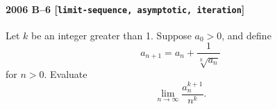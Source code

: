 \paragraph{2006 B--6 \textnormal{[\texttt{limit-sequence, asymptotic, iteration}]}}
Let $k$ be an integer greater than 1. Suppose $a_0 > 0$, and define
\[
a_{n+1} = a_n + \frac{1}{\sqrt[k]{a_n}}
\]
for $n > 0$. Evaluate
\[
\lim_{n \to \infty} \frac{a_n^{k+1}}{n^k}.
\]

